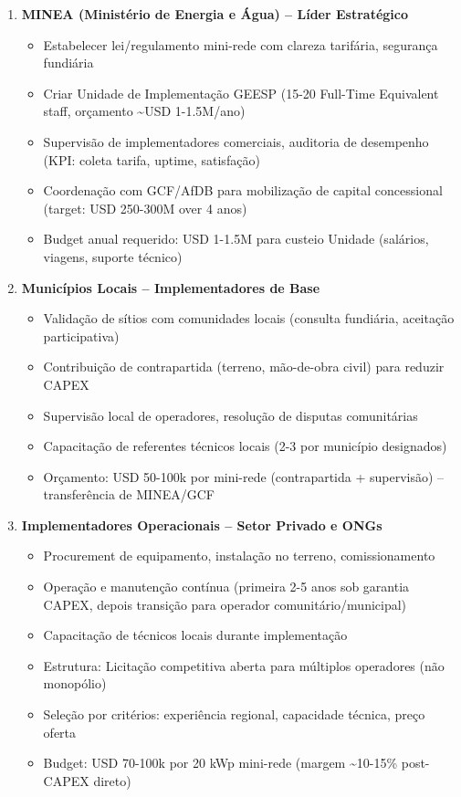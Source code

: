 \documentclass[12pt, a4paper]{article}
\begin{document}
\begin{enumerate}
\item \textbf{MINEA (Ministério de Energia e Água) -- Líder Estratégico}
   \begin{itemize}
   \item Estabelecer lei/regulamento mini-rede com clareza tarifária, segurança fundiária
   \item Criar Unidade de Implementação GEESP (15-20 Full-Time Equivalent staff, orçamento \textasciitilde{}USD 1-1.5M/ano)
   \item Supervisão de implementadores comerciais, auditoria de desempenho (KPI: coleta tarifa, uptime, satisfação)
   \item Coordenação com GCF/AfDB para mobilização de capital concessional (target: USD 250-300M over 4 anos)
   \item Budget anual requerido: USD 1-1.5M para custeio Unidade (salários, viagens, suporte técnico)
   \end{itemize}

\item \textbf{Municípios Locais -- Implementadores de Base}
   \begin{itemize}
   \item Validação de sítios com comunidades locais (consulta fundiária, aceitação participativa)
   \item Contribuição de contrapartida (terreno, mão-de-obra civil) para reduzir CAPEX
   \item Supervisão local de operadores, resolução de disputas comunitárias
   \item Capacitação de referentes técnicos locais (2-3 por município designados)
   \item Orçamento: USD 50-100k por mini-rede (contrapartida + supervisão) -- transferência de MINEA/GCF
   \end{itemize}

\item \textbf{Implementadores Operacionais -- Setor Privado e ONGs}
   \begin{itemize}
   \item Procurement de equipamento, instalação no terreno, comissionamento
   \item Operação e manutenção contínua (primeira 2-5 anos sob garantia CAPEX, depois transição para operador comunitário/municipal)
   \item Capacitação de técnicos locais durante implementação
   \item Estrutura: Licitação competitiva aberta para múltiplos operadores (não monopólio)
   \item Seleção por critérios: experiência regional, capacidade técnica, preço oferta
   \item Budget: USD 70-100k por 20 kWp mini-rede (margem \textasciitilde{}10-15\% post-CAPEX direto)
   \end{itemize}


\end{enumerate}
\end{document}
